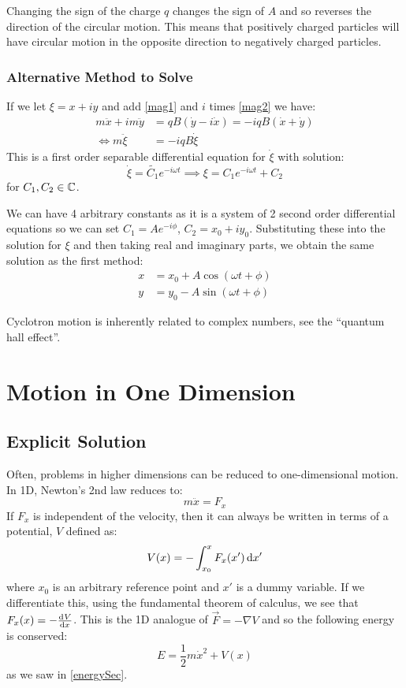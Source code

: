 \documentclass[../main.tex]{subfiles}
\begin{document}
Changing the sign of the charge $q$ changes the sign of $A$ and so reverses the direction of the circular motion.
This means that positively charged particles will have circular motion in the opposite direction to negatively charged particles.

\subsubsection{Alternative Method to Solve}
If we let $\xi = x + iy$ and add \cref{mag1} and $i$ times \cref{mag2} we have:
\begin{align*}
  m \ddot{x} + im\ddot{y} &= qB(\dot{y} - i\dot{x}) = -iqB(\dot{x} + \dot{y}) \\
  \iff m \ddot{\xi} &= -iqB \dot{\xi}
\end{align*}
This is a first order separable differential equation for $\dot{\xi}$ with solution:
\[
  \dot{\xi} = \widetilde{C_1} e^{- i\omega t} \implies \xi = C_1 e^{- i\omega t} + C_2
\]
for $C_1, C_2 \in \mathbb{C}$.

We can have 4 arbitrary constants as it is a system of 2 second order differential equations so we can set $C_1 = Ae^{-i \phi}$, $C_2 = x_0 + iy_0$.
Substituting these into the solution for $\xi$ and then taking real and imaginary parts, we obtain the same solution as the first method:
\begin{align*}
  x &= x_0 + A\cos(\omega t + \phi) \\
  y &= y_0 - A\sin(\omega t + \phi)
\end{align*}
\begin{remark}
  Cyclotron motion is inherently related to complex numbers, see the ``quantum hall effect''.
\end{remark}
\section{Motion in One Dimension}
\subsection{Explicit Solution}
Often, problems in higher dimensions can be reduced to one-dimensional motion.
In 1D, Newton's 2nd law reduces to:
\[
  m \ddot{x} = F_x
\]
If $F_x$ is independent of the velocity, then it can always be written in terms of a potential, $V$ defined as:
\[
  V(x) = - \int_{x_0}^{x} F_x(x') \d{x'}
\]
where $x_0$ is an arbitrary reference point and $x'$ is a dummy variable.
If we differentiate this, using the fundamental theorem of calculus, we see that $F_x(x) = -\deriv{V}{x}$.
This is the 1D analogue of $\vec{F} = - \nabla V$ and so the following energy is conserved:
\[
  E = \frac{1}{2} m \dot{x}^2 + V(x)
\]
as we saw in \cref{energySec}.
\end{document}
